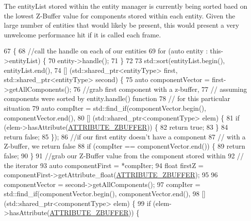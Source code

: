 The entity\-List stored within the entity manager is currently being sorted baed on the lowest Z-\/\-Buffer value for components stored within each entity. Given the large number of entities that would likely be present, this would present a very unwelcome performance hit if it is called each frame. 
\begin{DoxyCode}
67                                    \{
68     \textcolor{comment}{//call the handle on each of our entities}
69     \textcolor{keywordflow}{for} (\textcolor{keyword}{auto} entity : this->entityList) \{
70         entity->handle();
71     \}
72     
73     std::sort(entityList.begin(), entityList.end(),
74         [] (std::shared\_ptr<entityType> first, std::shared\_ptr<entityType> second) \{
75             \textcolor{keyword}{auto} componentVector = first->getAllComponents();
76             \textcolor{comment}{//grab first component with a z-buffer,}
77             \textcolor{comment}{// assuming components were sorted by entity.handle() function}
78             \textcolor{comment}{// for this particular situation}
79             \textcolor{keyword}{auto} compIter = std::find\_if(componentVector.begin(), componentVector.end(),
80                 [] (std::shared\_ptr<componentType> elem) \{
81                     \textcolor{keywordflow}{if} (elem->hasAttribute(\hyperlink{_a_e___attributes_8h_af11539bb711833d6321aaccd369e9e4b}{ATTRIBUTE\_ZBUFFER})) \{
82                         \textcolor{keywordflow}{return} \textcolor{keyword}{true};
83                     \}
84                     \textcolor{keywordflow}{return} \textcolor{keyword}{false};
85             \});
86             \textcolor{comment}{//if our first entity doesn't have a component}
87             \textcolor{comment}{// with a Z-buffer, we return false}
88             \textcolor{keywordflow}{if} (compIter == componentVector.end()) \{
89                 \textcolor{keywordflow}{return} \textcolor{keyword}{false};
90             \}
91             \textcolor{comment}{//grab our Z-Buffer value from the component stored within}
92             \textcolor{comment}{// the iterator}
93             \textcolor{keyword}{auto} componentFirst = *compIter;
94             \textcolor{keywordtype}{float} firstZ = componentFirst->getAttribute\_float(\hyperlink{_a_e___attributes_8h_af11539bb711833d6321aaccd369e9e4b}{ATTRIBUTE\_ZBUFFER});
95 
96             componentVector = second->getAllComponents();
97             compIter = std::find\_if(componentVector.begin(), componentVector.end(),
98                 [] (std::shared\_ptr<componentType> elem) \{
99                     \textcolor{keywordflow}{if} (elem->hasAttribute(\hyperlink{_a_e___attributes_8h_af11539bb711833d6321aaccd369e9e4b}{ATTRIBUTE\_ZBUFFER})) \{

\end{DoxyCode}
